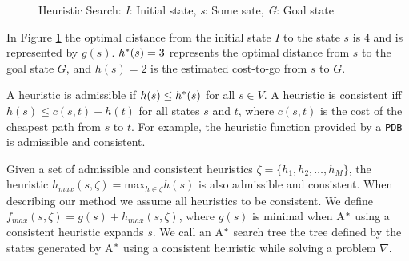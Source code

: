 \begin{figure}[htb]
\centering
{}
\caption{Heuristic Search: \textit{I}: Initial state, \textit{s}: Some sate, \textit{G}: Goal state} \label{fig:searchSpace}
\end{figure}

In Figure \ref{fig:searchSpace} the optimal distance from the initial state $I$ to  the state $s$ is 4 and is represented by $g(s)$. $h\sp{*}(s) = 3$ represents the optimal distance from $s$ to the goal state $G$, and $h(s) = 2$ is the estimated cost-to-go from $s$ to $G$.

A heuristic is admissible if $h(s) \leq h\sp{*}(s)$ for all $s \in V$. %
A heuristic is consistent iff $h(s) \leq c(s,t) + h(t)$ for all states $s$ and $t$, where $c(s,t)$ is the cost of the cheapest path from $s$ to $t$. For example, the heuristic function provided by a \texttt{PDB} \cite{culberson1998pattern} is admissible and consistent.

Given a set of admissible and consistent heuristics $\zeta = \{h_{1}, h_{2}, \dots, h_{M}\}$, the heuristic $h_{max}(s,\zeta) = $max$_{h \in \zeta} h(s)$ is also admissible and consistent. When describing our method we assume all heuristics to be consistent. We define $f_{max}(s, \zeta) = g(s) + h_{max}(s, \zeta)$, where $g(s)$ is minimal when A$\sp{*}$ using a consistent heuristic expands $s$. We call an A$\sp{*}$ search tree the tree defined by the states generated by A$\sp{*}$ using a consistent heuristic while solving a problem $\nabla$.

